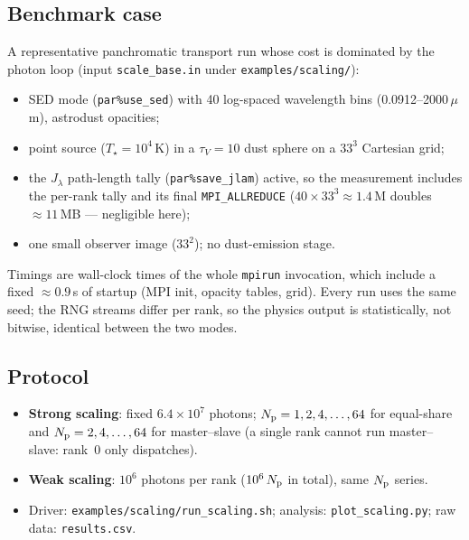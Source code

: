 \documentclass[english,a4paper]{kiseon_memo}
\newcommand{\code}[1]{\texttt{#1}}
\newcommand{\file}[1]{\texttt{#1}}
\newcommand{\pp}[1]{\texttt{par\%#1}}
\newcommand{\Np}{N_{\rm p}}
\begin{document}
\subsection{Benchmark case}
A representative panchromatic transport run whose cost is dominated by the
photon loop (input \file{scale\_base.in} under \file{examples/scaling/}):
\begin{itemize}
\item SED mode (\pp{use\_sed}) with 40 log-spaced wavelength bins
      (0.0912--2000\,$\mu$m), astrodust opacities;
\item point source ($T_\star = 10^4$\,K) in a $\tau_V = 10$ dust sphere on a
      $33^3$ Cartesian grid;
\item the $J_\lambda$ path-length tally (\pp{save\_jlam}) active, so the
      measurement includes the per-rank tally and its final
      \code{MPI\_ALLREDUCE} ($40\times33^3 \approx 1.4$\,M doubles
      ${\approx}11$\,MB --- negligible here);
\item one small observer image ($33^2$); no dust-emission stage.
\end{itemize}
Timings are wall-clock times of the whole \code{mpirun} invocation, which
include a fixed ${\approx}0.9$\,s of startup (MPI init, opacity tables, grid).
Every run uses the same seed; the RNG streams differ per rank, so the physics
output is statistically, not bitwise, identical between the two modes.

\subsection{Protocol}
\begin{itemize}
\item \textbf{Strong scaling}: fixed $6.4\times10^{7}$ photons;
      $\Np = 1,2,4,\dots,64$ for equal-share and $\Np = 2,4,\dots,64$ for
      master--slave (a single rank cannot run master--slave: rank~0 only
      dispatches).
\item \textbf{Weak scaling}: $10^{6}$ photons per rank
      ($10^6\,\Np$ in total), same $\Np$ series.
\item Driver: \file{examples/scaling/run\_scaling.sh}; analysis:
      \file{plot\_scaling.py}; raw data: \file{results.csv}.
\end{itemize}
\end{document}
